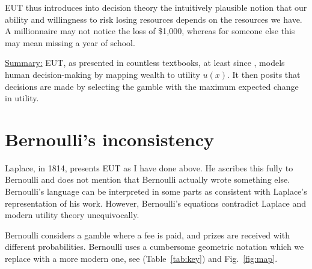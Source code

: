 \documentclass[dvips,draft]{ectaart}
\newcommand{\tref}[1]{(Table~\ref{tab:#1})}
\newcommand{\fref}[1]{Fig.~\ref{fig:#1}}
\begin{document}
EUT thus introduces into decision theory the intuitively plausible notion that our ability and willingness to risk losing resources depends on the resources we have. A millionnaire may not notice the loss of \$1,000, whereas for someone else this may mean missing a year of school.

\underline{Summary:} EUT, as presented in countless textbooks, at least since \cite{Laplace1814}, models human decision-making by mapping wealth to utility $u(x)$. It then posits that decisions are made by selecting the gamble with the maximum expected change in utility.

\section{Bernoulli's inconsistency}
Laplace, in 1814, presents EUT as I have done above. He ascribes this fully to Bernoulli and does not mention that Bernoulli actually wrote something else. Bernoulli's language can be interpreted in some parts as consistent with Laplace's representation of his work. However, Bernoulli's equations contradict Laplace and modern utility theory unequivocally.

Bernoulli considers a gamble where a fee is paid, and prizes are received with different probabilities. Bernoulli uses a cumbersome geometric notation which we replace with a more modern one, see \tref{key} and \fref{map}.
\end{document}
